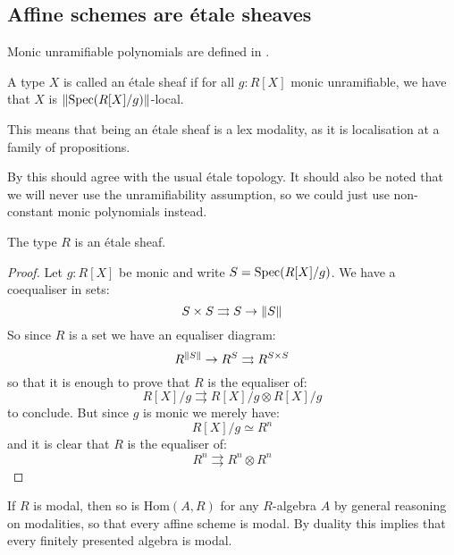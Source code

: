 \label{etale-sheaves}

\subsection{Affine schemes are \'etale sheaves}



Monic unramifiable polynomials are defined in \cite{wraith79}.

\begin{definition}
A type $X$ is called an \'etale sheaf if for all $g:R[X]$ monic unramifiable, we have that $X$ is $\lVert \operatorname{Spec}(R[X]/g) \rVert$-local.
\end{definition}

This means that being an \'etale sheaf is a lex modality, as it is localisation at a family of propositions. 

\begin{remark}
By \cite{wraith79} this should agree with the usual \'etale topology. It should also be noted that we will never use the unramifiability assumption, so we could just use non-constant monic polynomials instead.
\end{remark}

\begin{lemma}\label{etale-subcanonical}
The type $R$ is an \'etale sheaf.
\end{lemma}

\begin{proof}
Let $g:R[X]$ be monic and write $S=\operatorname{Spec}(R[X]/g)$. We have a coequaliser in sets:
\[S\times S\rightrightarrows S \to \lVert S \rVert\]
So since $R$ is a set we have an equaliser diagram:
\[R^{\lVert S \rVert} \to R^S\rightrightarrows R^{S\times S}\]
so that it is enough to prove that $R$ is the equaliser of:
\[R[X]/g \rightrightarrows R[X]/g \otimes R[X]/g\]
to conclude. But since $g$ is monic we merely have:
\[R[X]/g \simeq R^n\]
and it is clear that $R$ is the equaliser of:
\[R^n \rightrightarrows R^n\otimes R^n\]
\end{proof}

\begin{remark}\label{R-modal-subcanonical}
If $R$ is modal, then so is $\mathrm{Hom}(A,R)$ for any $R$-algebra $A$ by general reasoning on modalities, so that every affine scheme is modal. By duality this implies that every finitely presented algebra is modal.
\end{remark}


